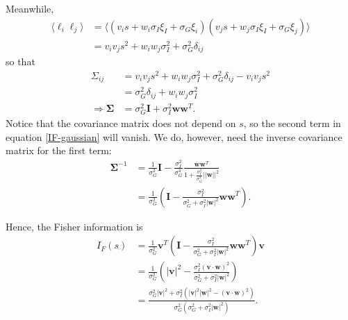 \documentclass[11pt]{article}
\begin{document}
	Meanwhile,
	\begin{align}
		\langle \ell_i \ell_j \rangle &= \langle (v_i s + w_i \sigma_I\xi_I + \sigma_G\xi_i) (v_j s + w_j \sigma_I\xi_I + \sigma_G\xi_j)\rangle \\
		&= v_i v_j s^2 + w_i w_j \sigma_I^2 + \sigma_G^2 \delta_{ij}
	\end{align}
	so that
	\begin{align}
		\Sigma_{ij} &= v_i v_j s^2 + w_i w_j \sigma_I^2 + \sigma_G^2 \delta_{ij} - v_i v_j s^2 \\
		&= \sigma_G^2 \delta_{ij} + w_i w_j \sigma_I^2 \\
		\Rightarrow \boldsymbol{\Sigma} &= \sigma_G^2 \mathbf{I} + \sigma_I^2\mathbf{ww}^T.
	\end{align}
	Notice that the covariance matrix does not depend on $s$, so the second term in equation \eqref{IF-gaussian} will vanish. We do, however, need the inverse covariance matrix for the first term:
	\begin{align}
		\boldsymbol{\Sigma}^{-1} &= \frac{1}{\sigma_G^2} \mathbf{I} - \frac{\sigma_I^2}{\sigma_G^4} \frac{\mathbf{ww}^T}{1+\frac{\sigma_I^2}{\sigma_G^2}||\mathbf{w}||^2}\\
		&= \frac{1}{\sigma_G^2}\left(\mathbf{I} - \frac{\sigma_I^2}{\sigma_G^2 + \sigma_I^2 |\mathbf{w}|^2}\mathbf{ww}^T\right).
	\end{align}
	
	Hence, the Fisher information is
	\begin{align}
		I_{F}(s) &= \frac{1}{\sigma_G^2}\mathbf{v}^T \left(\mathbf{I} - \frac{\sigma_I^2}{\sigma_G^2 + \sigma_I^2 |\mathbf{w}|^2}\mathbf{ww}^T\right) \mathbf{v} \\
		&= \frac{1}{\sigma_G^2} \left(|\mathbf{v}|^2 - \frac{\sigma_I^2 (\mathbf{v}\cdot\mathbf{w})^2}{\sigma_G^2 + \sigma_I^2 |\mathbf{w}|^2}\right) \\
		&= \frac{\sigma_G^2 |\mathbf{v}|^2 + \sigma_I^2 \left(|\mathbf{v}|^2|\mathbf{w}|^2 - (\mathbf{v}\cdot\mathbf{w})^2\right)}{\sigma_G^2 (\sigma_G^2 + \sigma_I^2 |\mathbf{w}|^2)}.
	\end{align}
	\newpage
\end{document}
